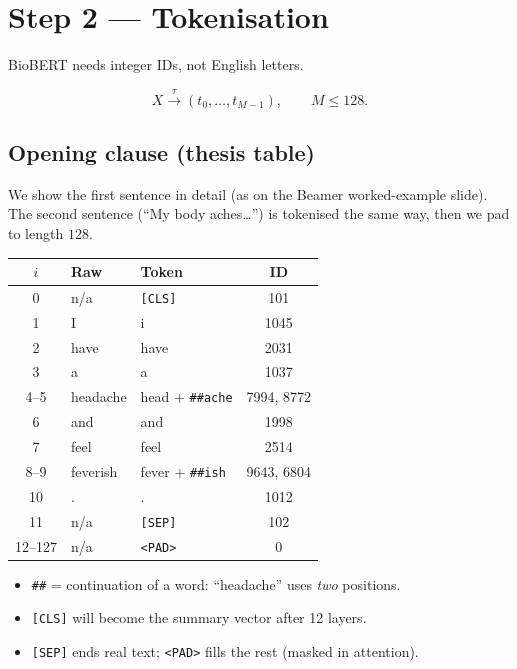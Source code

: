 \section{Step 2 --- Tokenisation}
\label{sec:tokens}

BioBERT needs integer IDs, not English letters.

\[
  X \xrightarrow{\tau} (t_0,\ldots,t_{M-1}), \qquad M \le 128.
\]

\subsection*{Opening clause (thesis table)}

We show the first sentence in detail (as on the Beamer worked-example slide). The second sentence (``My body aches\ldots'') is tokenised the same way, then we pad to length \(128\).

\begin{center}
\footnotesize
\begin{tabular}{@{}cllc@{}}
\toprule
\(i\) & Raw & Token & ID \\
\midrule
0 & n/a & \texttt{[CLS]} & 101 \\
1 & I & i & 1045 \\
2 & have & have & 2031 \\
3 & a & a & 1037 \\
4--5 & headache & head + \texttt{\#\#ache} & 7994, 8772 \\
6 & and & and & 1998 \\
7 & feel & feel & 2514 \\
8--9 & feverish & fever + \texttt{\#\#ish} & 9643, 6804 \\
10 & . & . & 1012 \\
11 & n/a & \texttt{[SEP]} & 102 \\
12--127 & n/a & \texttt{<PAD>} & 0 \\
\bottomrule
\end{tabular}
\end{center}

\begin{itemize}
  \item \texttt{\#\#} = continuation of a word: ``headache'' uses \emph{two} positions.
  \item \texttt{[CLS]} will become the summary vector after 12 layers.
  \item \texttt{[SEP]} ends real text; \texttt{<PAD>} fills the rest (masked in attention).
\end{itemize}

